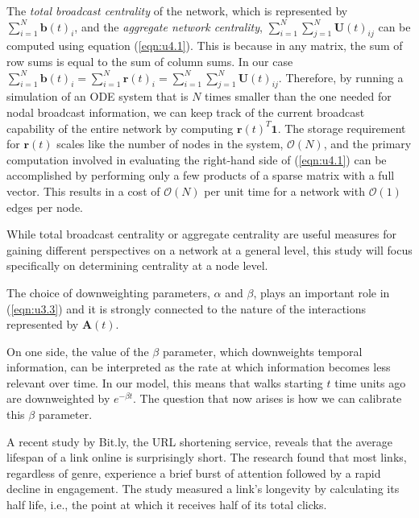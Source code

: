 The \textit{total broadcast centrality} of the network, which is represented by $\sum_{i=1}^{N} \mathbf{b}(t)_i$, and the \textit{aggregate network centrality}, $\sum_{i=1}^{N}\sum_{j=1}^{N} \mathbf{U}(t)_{ij}$ can be computed using equation (\ref{eqn:u4.1}). This is because in any matrix, the sum of row sums is equal to the sum of column sums. In our case $\sum_{i=1}^{N} \mathbf{b}(t)_i = \sum_{i=1}^{N} \mathbf{r}(t)_i=\sum_{i=1}^{N}\sum_{j=1}^{N} \mathbf{U}(t)_{ij}$. Therefore, by running a simulation of an ODE system that is $N$ times smaller than the one needed for nodal broadcast information, we can keep track of the current broadcast capability of the entire network by computing $\mathbf{r}(t)^T\mathbf{1}$. The storage requirement for $\mathbf{r}(t)$ scales like the number of nodes in the system, $\mathcal{O}(N)$, and the primary computation involved in evaluating the right-hand side of (\ref{eqn:u4.1}) can be accomplished by performing only a few products of a sparse matrix with a full vector. This results in a cost of $\mathcal{O}(N)$ per unit time for a network with $\mathcal{O}(1)$ edges per node.

While total broadcast centrality or aggregate centrality are useful measures for gaining different perspectives on a network at a general level, this study will focus specifically on determining centrality at a node level.

\begin{highlightedParagraphC}
 
The choice of downweighting parameters, $\alpha$ and $\beta$, plays an important role in (\ref{eqn:u3.3}) and it is strongly connected to the nature of the interactions represented by $\mathbf{A}(t)$.

\end{highlightedParagraphC}

On one side, the value of the $\beta$ parameter, which downweights temporal information, can be interpreted as the rate at which information becomes less relevant over time. In our model, this means that walks starting $t$ time units ago are downweighted by $e^{-\beta t}$. The question that now arises is how we can calibrate this $\beta$ parameter.
 
A recent study \cite{lifespan} by Bit.ly, the URL shortening service, reveals that the average lifespan of a link online is surprisingly short. The research found that most links, regardless of genre, experience a brief burst of attention followed by a rapid decline in engagement. The study measured a link's longevity by calculating its half life, i.e., the point at which it receives half of its total clicks.

